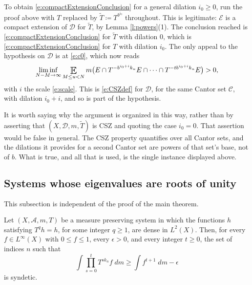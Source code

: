 \begin{remark} \label{r:dilation}
To obtain \eqref{e:compactExtensionConclusion} for a general dilation $i_0 \geq 0$, run the proof above with $T$ replaced by 
$\widetilde T \coloneqq T ^{b ^{i_0}}$ throughout.  This is legitimate: $\mathcal E$ is a compact extension of $\mathcal D$ for $\widetilde T$, 
by Lemma \ref{l:powers}(1).  The conclusion reached is \eqref{e:compactExtensionConclusion} for $\widetilde T$ with dilation $0$, 
which is \eqref{e:compactExtensionConclusion} for $T$ with dilation $i_0$.  
The only appeal to the hypothesis on $\mathcal D$ is at \eqref{e:c0}, which now reads 
\begin{equation}
\liminf_{N-M\to\infty}  \Expectation_{M\leq u<N} 
m \bigl( E \cap T ^{-b ^{i_0+i}k_u}E \cap \cdots \cap T ^{-tb ^{i_0+i}k_u}E \bigr)>0 , 
\end{equation}
with $i$ the scale \eqref{e:scale}.  This is \eqref{e:CSZdef} for $\mathcal D$, for the same Cantor set $\mathcal C$, with dilation $i_0+i$, 
and so is part of the hypothesis.  

It is worth saying why the argument is organized in this way, rather than by asserting that $(X,\mathcal D,m,\widetilde T)$ is CSZ and quoting the case $i_0=0$.  
That assertion would be false in general.  The CSZ property quantifies over all Cantor sets, and the dilations it provides for a second Cantor set 
are powers of that set's base, not of $b$.  What is true, and all that is used, is the single instance displayed above.  
\end{remark}

\subsection{Systems whose eigenvalues are roots of unity} \label{sub:rootsOfUnity}

This subsection is independent of the proof of the main theorem.  

\begin{theorem} \label{t:compactSystem} 
Let $(X,\mathcal A, m,T)$ be a measure preserving system in which the functions $h$ satisfying $T ^{q}h = h$, for some integer $q \geq 1$, 
are dense in $L^2(X)$.  Then, for every $f\in L^\infty(X)$ with $0 \leq f \leq 1$, every $\epsilon >0$, and every integer $t \geq 0$, the set of indices 
$n$ such that  
\begin{equation} \label{e:compactSystem}
\int \prod _{s=0} ^{t} T ^{s k_n } f 
\;dm \geq \int f ^{t+1}\;dm - \epsilon 
\end{equation}
is syndetic.  
\end{theorem}

